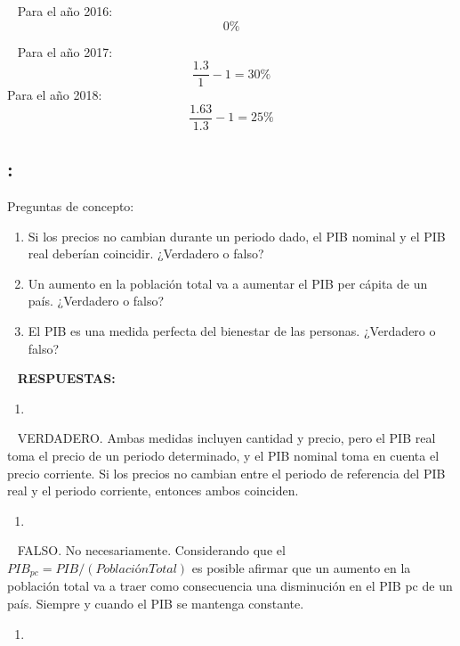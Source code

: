 \documentclass[
  letterpaper,
  DIV=11,
  numbers=noendperiod]{scrreport}
\providecommand{\tightlist}{%
  \setlength{\itemsep}{0pt}\setlength{\parskip}{0pt}}\usepackage{longtable,booktabs,array}
\begin{document}
~ Para el año 2016: \[
0\%
\]

~ Para el año 2017: \[
\frac{1.3}{1}-1=30\%
\] Para el año 2018: \[
\frac{1.63}{1.3}-1=25\%
\]

\hypertarget{section-19}{%
\subsection{:}\label{section-19}}

Preguntas de concepto:

\begin{enumerate}
\def\labelenumi{\alph{enumi})}
\item
  Si los precios no cambian durante un periodo dado, el PIB nominal y el
  PIB real deberían coincidir. ¿Verdadero o falso?
\item
  Un aumento en la población total va a aumentar el PIB per cápita de un
  país. ¿Verdadero o falso?
\item
  El PIB es una medida perfecta del bienestar de las personas.
  ¿Verdadero o falso?
\end{enumerate}

~ \textbf{RESPUESTAS:}

\begin{enumerate}
\def\labelenumi{\alph{enumi})}
\tightlist
\item
\end{enumerate}

~ VERDADERO. Ambas medidas incluyen cantidad y precio, pero el PIB real
toma el precio de un periodo determinado, y el PIB nominal toma en
cuenta el precio corriente. Si los precios no cambian entre el periodo
de referencia del PIB real y el periodo corriente, entonces ambos
coinciden.

\begin{enumerate}
\def\labelenumi{\alph{enumi})}
\setcounter{enumi}{1}
\tightlist
\item
\end{enumerate}

~ FALSO. No necesariamente. Considerando que el
\(PIB_{pc}=PIB/(Población Total)\) es posible afirmar que un aumento en
la población total va a traer como consecuencia una disminución en el
PIB pc de un país. Siempre y cuando el PIB se mantenga constante.

\begin{enumerate}
\def\labelenumi{\alph{enumi})}
\setcounter{enumi}{2}
\tightlist
\item
\end{enumerate}
\end{document}
